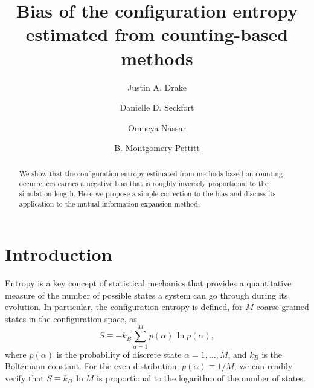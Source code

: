 \documentclass[reprint, superscriptaddress]{revtex4-1}
\begin{document}
\title{Bias of the configuration entropy estimated from counting-based methods}

\author{Justin A. Drake}
\author{Danielle D. Seckfort}
\author{Omneya Nassar}
\author{B. Montgomery Pettitt}

\begin{abstract}
We show that the configuration entropy estimated from methods based on counting occurrences
carries a negative bias
that is roughly inversely proportional to the simulation length.
%
Here we propose a simple correction to the bias
and discuss its application to the mutual information expansion method.
\end{abstract}

\maketitle


\section{Introduction}

Entropy is a key concept of statistical mechanics that provides a quantitative measure of
the number of possible states a system can go through during its evolution.
%
In particular, the configuration entropy is defined,
for $M$ coarse-grained states in the configuration space, as
%
\begin{equation}
  S
  \equiv
  -k_B \sum_{\alpha = 1}^M p(\alpha) \, \ln p(\alpha)
  ,
  \label{eq:entropy_def}
\end{equation}
%
where $p(\alpha)$ is the probability of discrete state $\alpha = 1, \dots, M$,
and $k_B$ is the Boltzmann constant.
%
For the even distribution, $p(\alpha) \equiv 1/M$,
we can readily verify that $S \equiv k_B \, \ln M$
is proportional to the logarithm of the number of states.
\end{document}
